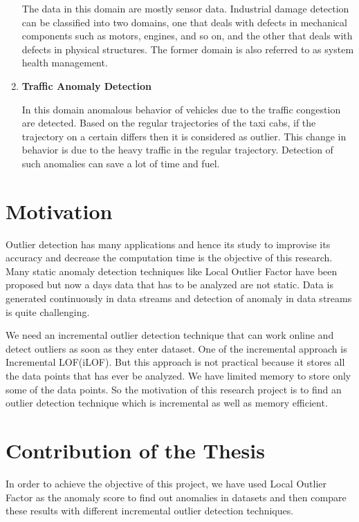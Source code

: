 \begin{enumerate}
The data in this domain are mostly sensor data. Industrial damage detection
can be classified into two domains, one that deals with defects in mechanical
components such as motors, engines, and so on, and the other that deals with defects
in physical structures. The former domain is also referred to as system health
management.


\item \textbf{Traffic Anomaly Detection}\

In this  domain 
anomalous behavior of vehicles due to the traffic congestion are detected. Based on the regular trajectories of the taxi cabs, if the trajectory on a certain differs then it is considered as outlier. This change in behavior is due to the heavy traffic in the regular trajectory. Detection of such anomalies can save a lot of time and fuel.   

\end{enumerate}



 
	
\section{Motivation}
Outlier detection has many applications and hence its study to improvise its accuracy and decrease the computation time is the objective of this research. Many static anomaly detection techniques like Local Outlier Factor have been proposed but now a days data that has to be analyzed are not static. Data is generated continuously in data streams and detection of anomaly in data streams is quite challenging. 

\par

We need an incremental outlier detection technique that can work online and detect outliers as soon as they enter dataset. One of the incremental approach is Incremental LOF(iLOF). But this approach is not practical because it stores all the data points that has ever be analyzed. We have limited memory to store only some of the data points. So the motivation of this research project is to find an outlier detection technique which is incremental as well as memory efficient.  

	
	
	
\section{Contribution of the Thesis}
In order to achieve the objective of this project, we have used Local Outlier Factor as the anomaly score to find out anomalies in datasets and then compare these results with different incremental outlier detection techniques. 

